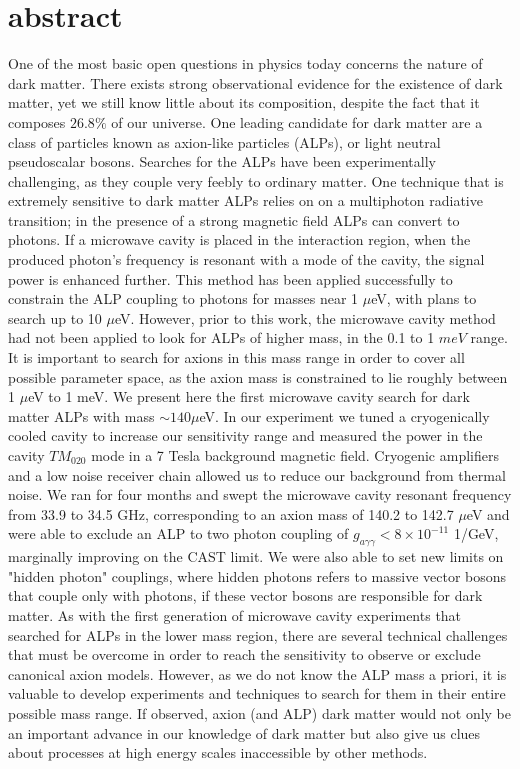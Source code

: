 \documentclass[12pt,twosides]{book}
\begin{document}
\section{abstract}

One of the most basic open questions in physics today concerns the nature of dark matter. There exists strong observational evidence for the existence of dark matter, yet we still know little about its composition, despite the fact that it composes $26.8\%$ of our universe. One leading candidate for dark matter are a class of particles known as axion-like particles (ALPs), or light neutral pseudoscalar bosons. Searches for the ALPs have been experimentally challenging, as they couple very feebly to ordinary matter. One technique that is extremely sensitive to dark matter ALPs relies on on a multiphoton radiative transition; in the presence of a strong magnetic field ALPs can convert to photons. If a microwave cavity is placed in the interaction region, when the produced photon's frequency is resonant with a mode of the cavity, the signal power is enhanced further. This method has been applied successfully to constrain the ALP coupling to photons for masses near 1 $\mu$eV, with plans to search up to 10 $\mu$eV. However, prior to this work, the microwave cavity method had not been applied to look for ALPs of higher mass, in the 0.1 to 1 $meV$ range. It is important to search for axions in this mass range in order to cover all possible parameter space, as the axion mass is constrained to lie roughly between 1 $\mu$eV to 1 meV. We present here the first microwave cavity search for dark matter ALPs with mass $\sim 140 \mu$eV. In our experiment we tuned a cryogenically cooled cavity to increase our sensitivity range and measured the power in the cavity $TM_{020}$ mode in a 7 Tesla background magnetic field. Cryogenic amplifiers and a low noise receiver chain allowed us to reduce our background from thermal noise. We ran for four months and swept the microwave cavity resonant frequency from 33.9 to 34.5 GHz, corresponding to an axion mass of 140.2  to 142.7 $\mu$eV and were able to exclude an ALP to two photon coupling of $g_{a\gamma\gamma} < 8\times10^{-11}$ 1/GeV, marginally improving on the CAST limit. We were also able to set new limits on "hidden photon" couplings, where hidden photons refers to massive vector bosons that couple only with photons, if these vector bosons are responsible for dark matter. As with the first generation of microwave cavity experiments that searched for ALPs in the lower mass region, there are several technical challenges that must be overcome in order to reach the sensitivity to observe or exclude canonical axion models. However, as we do not know the ALP mass a priori, it is valuable to develop experiments and techniques to search for them in their entire possible mass range. If observed, axion (and ALP) dark matter would not only be an important advance in our knowledge of dark matter but also give us clues about processes at high energy scales inaccessible by other methods.
\end{document}
